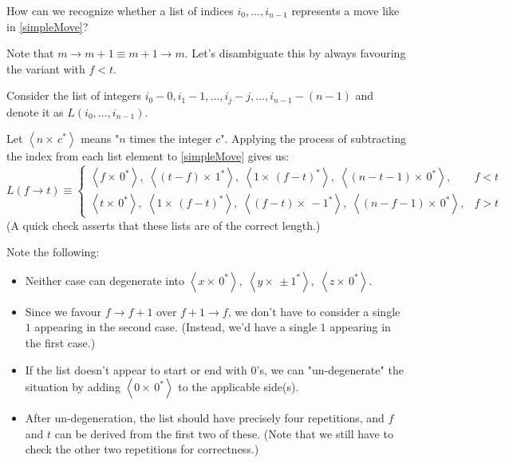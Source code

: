 \documentclass[12pt]{amsart}
\newcommand{\move}[2]{\ensuremath{#1 \rightarrow #2}}
\newcommand{\concat}[0]{\ensuremath{, \;}}
\newcommand{\rep}[2]{\ensuremath{\left<#1 \times \, #2^{\ast}\right>}}	%
\begin{document}
How can we recognize whether a list of indices $i_0, \ldots, i_{n-1}$ represents a move like in \eqref{simpleMove}?

Note that $\move{m}{m + 1} \equiv \move{m + 1}{m}$.
Let's disambiguate this by always favouring the variant with $f < t$.

Consider the list of integers $i_0 - 0, i_1 - 1, \ldots, i_j - j, \ldots, i_{n-1} - (n-1)$ and denote it as $L(i_0, \ldots, i_{n-1})$.

Let $\rep{n}{c}$ means "$n$ times the integer $c$".
Applying the process of subtracting the index from each list element to \eqref{simpleMove} gives us:
$$
L(\move{f}{t}) \equiv
\begin{cases}
	\rep{f}{0} \concat \rep{(t-f)}{1} \concat \rep{1}{(f-t)} \concat \rep{(n-t-1)}{0},		& f < t \\
	\rep{t}{0} \concat \rep{1}{(f-t)} \concat \rep{(f-t)}{-1} \concat \rep{(n-f-1)}{0},		& f > t
\end{cases}
$$
(A quick check asserts that these lists are of the correct length.)

Note the following:
\begin{itemize}
	\item Neither case can degenerate into $\rep{x}{0} \concat \rep{y}{\pm 1} \concat \rep{z}{0}$.
	\item Since we favour $\move{f}{f+1}$ over $\move{f+1}{f}$, we don't have to consider a single $1$ appearing in the second case.
		(Instead, we'd have a single $1$ appearing in the first case.)
	\item If the list doesn't appear to start or end with 0's, we can "un-degenerate" the situation by adding $\rep{0}{0}$ to the applicable side(s).
	\item After un-degeneration, the list should have precisely four repetitions, and $f$ and $t$ can be derived from the first two of these.
		(Note that we still have to check the other two repetitions for correctness.)
\end{itemize}
\end{document}

